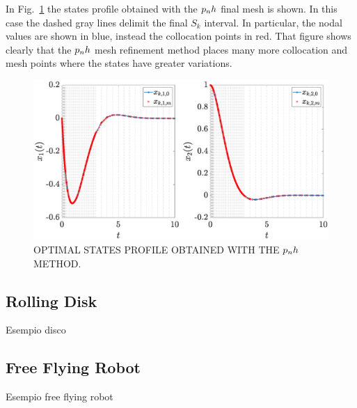 In Fig.~\ref{fig:vanderpolstates} the states profile obtained with the $p_{n}h$ final mesh is shown. In this case the dashed gray lines delimit the final $S_k$ interval. In particular, the nodal values are shown in blue, instead the collocation points in red. That figure shows clearly that the $p_{n}h$ mesh refinement method places many more collocation and mesh points where the states have greater variations.

\begin{figure}
	\centering
	\includegraphics[trim={2cm 0cm 4cm 0cm},clip,width=1.\linewidth]{Img/vanderpol_states}
	\caption{OPTIMAL STATES PROFILE OBTAINED WITH THE $p_{n}h$ METHOD.}
	\label{fig:vanderpolstates}
\end{figure}

\subsection*{Rolling Disk}
Esempio disco

\subsection*{Free Flying Robot}
Esempio free flying robot

